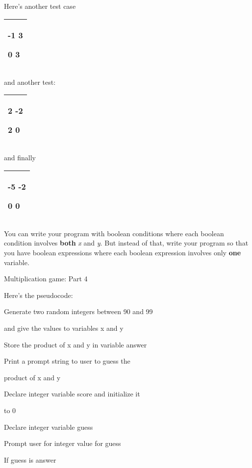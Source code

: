 \documentclass[
]{article}
\begin{document}
Here's another test case

\begin{longtable}[]{@{}l@{}}
\toprule
\endhead
\begin{minipage}[t]{0.97\columnwidth}\raggedright
-1 3

0 3\strut
\end{minipage}\tabularnewline
\bottomrule
\end{longtable}

and another test:

\begin{longtable}[]{@{}l@{}}
\toprule
\endhead
\begin{minipage}[t]{0.97\columnwidth}\raggedright
2 -2

2 0\strut
\end{minipage}\tabularnewline
\bottomrule
\end{longtable}

and finally

\begin{longtable}[]{@{}l@{}}
\toprule
\endhead
\begin{minipage}[t]{0.97\columnwidth}\raggedright
-5 -2

0 0\strut
\end{minipage}\tabularnewline
\bottomrule
\end{longtable}

You can write your program with boolean conditions where each boolean
condition involves \textbf{both} \emph{x} and \emph{y}. But instead of
that, write your program so that you have boolean expressions where each
boolean expression involves only \textbf{one} variable.

Multiplication game: Part 4

Here's the pseudocode:

Generate two random integers between 90 and 99

and give the values to variables x and y

Store the product of x and y in variable answer

Print a prompt string to user to guess the

product of x and y

Declare integer variable score and initialize it

to 0

Declare integer variable guess

Prompt user for integer value for guess

If guess is answer
\end{document}
